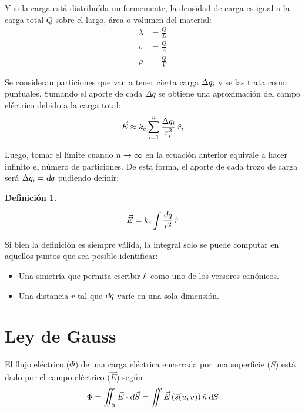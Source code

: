 \documentclass[a5paper,12pt,twoside]{book}
\newtheorem{defn}{{Definición}}[chapter]
\begin{document}
Y si la carga está distribuída uniformemente, la densidad de carga es igual a la carga total $Q$ sobre el largo, área o volumen del material:
\begin{align*}
    \lambda &= \frac{Q}{L}
    \\[1ex]
    \sigma &= \frac{Q}{A}
    \\[1ex]
    \rho &= \frac{Q}{V}
\end{align*}

Se consideran particiones que van a tener cierta carga $\Delta q_i$ y se las trata como puntuales. Sumando el aporte de cada $\Delta q$ se obtiene una aproximación del campo eléctrico debido a la carga total:
\begin{equation*}
    \Vec{E} \approx k_e \sum_{i=1}^n \frac{\Delta q_i}{r_i^2} \, \hat{r}_i
\end{equation*}

Luego, tomar el límite cuando $n\to\infty$ en la ecuación anterior equivale a hacer infinito el número de particiones. De esta forma, el aporte de cada trozo de carga será $\Delta q_i = \textsl{d} q$ pudiendo definir:

\begin{mdframed}[style=MyFrame1]
    \begin{defn}
    \end{defn}
    \begin{equation*}
        \Vec{E} = k_e \int \frac{\textsl{d} q}{r^2} \, \hat{r}
    \end{equation*}
\end{mdframed}

Si bien la definición es siempre válida, la integral solo se puede computar en aquellos puntos que sea posible identificar:
\begin{itemize}
    \item Una simetría que permita escribir $\hat{r}$ como uno de los versores canónicos.
    \item Una distancia $r$ tal que $\textsl{d} q$ varíe en una sola dimensión.
\end{itemize}


\section{Ley de Gauss}

El flujo eléctrico ($\Phi$) de una carga eléctrica encerrada por una superficie ($S$) está dado por el campo eléctrico ($\Vec{E}$) según
\begin{equation*}
    \Phi = \iint_S \Vec{E} \cdot \textsl{d} \Vec{S} = \iint \Vec{E} \left(\Vec{s}(u,v)\right) \hat{n} \, \textsl{d} S
\end{equation*}
\end{document}

